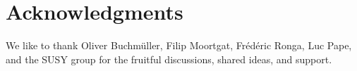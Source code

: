 \documentclass{cmspaper}
\begin{document}
\section{Acknowledgments}
We like to thank Oliver Buchm\"uller, Filip Moortgat, Fr\'ed\'eric Ronga,  Luc
Pape, and the SUSY group for the fruitful discussions, shared ideas, and
support.

%

\end{document}
